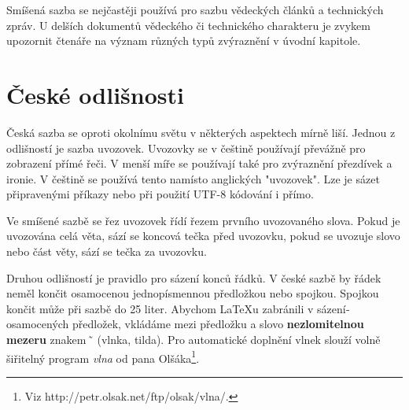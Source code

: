 \documentclass[a4paper, 11pt]{article}
\begin{document}
Smíšená sazba se nejčastěji používá pro sazbu vě\-deckých článků a technických zpráv. U delší­ch doku\-mentů vědeckého či technického charakteru je zvykem upozornit čtenáře na význam různých typů zvýrazně\-ní­ v úvodní­ kapitole.

\section{České odlišnosti}

Česká sazba se oproti okolní­mu světu v některých as\-pektech mí­rně liší­. Jednou z odlišností je sazba uvozovek. Uvozovky se v češtině použí­vají­ převážně pro zobrazení­ pří­mé řeči. V menší­ míře se použí­vají­ také pro zvýraznění­ přezdí­vek a ironie. V češtině se použí­vá tento  namí­sto anglických "uvozovek". Lze je sázet připravenými příkazy nebo při použití UTF-8 kódování i přímo.

Ve smíšené sazbě se řez uvozovek ří­dí­ řezem první­ho uvozovaného slova. Pokud je uvozována celá věta, sází­ se koncová tečka před uvozovku, pokud se uvozuje slovo nebo část věty, sází­ se tečka za uvozovku.

Druhou odlišností je pravidlo pro sázení­ konců řád\-ků. V české sazbě by řádek neměl končit osamocenou jednopí­smennou předložkou nebo spojkou. Spojkou  končit může při sazbě do 25 liter. Abychom \LaTeX u zabránili v sázení­ osamocených předložek, vkládáme mezi předložku a slovo {\bf nezlomitelnou mezeru} znakem\, \~  \, (vlnka, tilda). Pro automatické do\-plnění vlnek slouží­ volně šiřitelný program {\it vlna} od pana Olšáka\footnote{Viz http://petr.olsak.net/ftp/olsak/vlna/.}.
\end{document}
